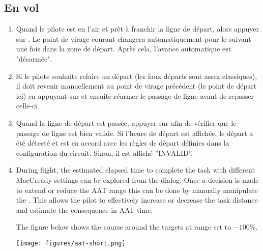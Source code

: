 \subsection*{En vol}
\begin{enumerate}
\item Quand le pilote est en l'air et prêt à franchir la ligne de départ, alors appuyer sur . Le point de virage courant changera automatiquement  pour le suivant une fois dans la zone de départ. Après cela, l'avance automatique est "désarmée". 
\item  Si le pilote souhaite refaire un départ (les faux départs sont assez classiques), il doit revenir manuellement au point de virage précédent (le point de départ ici) en appuyant sur    et ensuite réarmer   le passage de ligne avant de repasser celle-ci.
\item  Quand la ligne de départ est passée, appuyer sur    afin de vérifier que le passage de ligne est bien valide. Si l'heure de départ est affichée, le départ a été détecté et est en accord avec les règles de départ définies dans la configuration du circuit. Sinon, il est affiché ''INVALID''.
\item  During flight, the estimated elapsed time to complete the task with
different MacCready settings can be explored from the  dialog.
Once a decision is made to extend or reduce the AAT range this can be done by
manually manipulate the . This allows the pilot to effectively increase or decrease the task
distance and estimate the consequence in AAT time.

The figure below shows the course around the targets at range set to $-100$\%.
\begin{center}
\texttt{[image: figures/aat-short.png]}
\end{center}


\end{enumerate}
